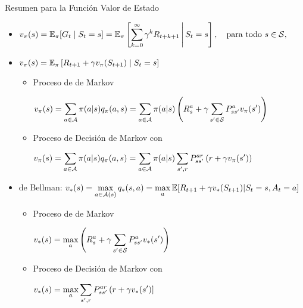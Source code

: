 \documentclass[10pt, envcountsect, handout, aspectratio=1610, hyperref={hypertexnames=true}]{beamer}
\begin{document}
\begin{frame}{Resumen para la \textcolor{reddark}{Función Valor de Estado}}

\begin{itemize}
\item {}
 \(\displaystyle    v_\pi(s) = \mathbb{E}_\pi[G_t \mid S_t = s] 
    		 = \mathbb{E}_\pi \left[ \sum_{k=0}^\infty \gamma^k R_{t+k+1} \,\middle|\, S_t = s \right], 
		 		\quad \text{para todo } s \in \mathcal{S},
\)

\item {} \(\displaystyle  v_\pi(s) = \mathbb{E}_\pi \left[ R_{t+1} + \gamma v_\pi(S_{t+1}) \mid S_t = s \right] \)

    \begin{itemize}
    \item Proceso de  de Markov
    
    \hfil $\displaystyle
        v_\pi(s) = \sum_{a\in{\cal A}} \pi(a|s) q_\pi(a,s) = \sum_{a\in{\cal A}} \pi(a|s) \left( R^{a}_s + \gamma \sum_{s'\in{\cal S}} P^{a}_{ss'} v_\pi(s') \right)
        $
    
    \item Proceso de Decisión de Markov con 
    
    \hfil $\displaystyle
    v_\pi(s) = \sum_{a\in{\cal A}} \pi(a|s) q_\pi(a,s) = \sum_{a\in{\cal A}} \pi(a|s) \sum_{s',r} P_{ss'}^{ar} \left( r + \gamma v_\pi(s') \right) 
    $
    \end{itemize}

\item {} de Bellman:
$\displaystyle v_*(s)  = \max_{a\in {\cal A}(s)} q_*(s,a) =  \max_a \mathbb{E}[R_{t+1} + \gamma v_*(S_{t+1}) |S_t=s, A_t=a]$


    \begin{itemize}
    \item Proceso de  de Markov
    
    \hfil $\displaystyle v_*(s) = \max_a \left( R_s^a + \gamma  \sum_{s'\in{\cal S}} P^{a}_{ss'} v_*(s') \right)$
    
    
    \item Proceso de Decisión de Markov con 
    
    \hfil $\displaystyle v_*(s) = \max_a \sum_{s', r} P_{ss'}^{ar} \left(r + \gamma v_*(s') \right]$
    \end{itemize}
\end{itemize}

\end{frame}
\end{document}
